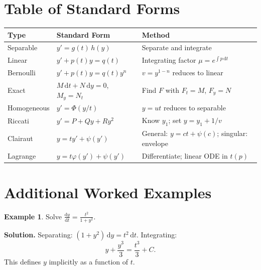 \documentclass[12pt,a4paper,openany]{book}
\theoremstyle{definition}
\newtheorem{example}[definition]{Example}
\theoremstyle{plain}
\theoremstyle{remark}
\newcommand{\dd}{\mathrm{d}}
\begin{document}
\section{Table of Standard Forms}
\label{sec:standard-forms-table}

\begin{center}
\renewcommand{\arraystretch}{1.6}
\begin{tabular}{@{}p{3cm}p{4.5cm}p{5.5cm}@{}}
\toprule
\textbf{Type} & \textbf{Standard Form} & \textbf{Method} \\
\midrule
Separable\index{separable equation} &
  $y' = g(t)\,h(y)$ &
  Separate and integrate \\
Linear\index{linear first-order ODE} &
  $y' + p(t)y = q(t)$ &
  Integrating factor $\mu = e^{\int p\,\dd t}$ \\
Bernoulli\index{Bernoulli equation} &
  $y' + p(t)y = q(t)y^n$ &
  $v = y^{1-n}$ reduces to linear \\
Exact\index{exact equation} &
  $M\,\dd t + N\,\dd y = 0$, $M_y = N_t$ &
  Find $F$ with $F_t=M$, $F_y=N$ \\
Homogeneous\index{homogeneous equation (first-order)} &
  $y' = \Phi(y/t)$ &
  $y = ut$ reduces to separable \\
Riccati\index{Riccati equation} &
  $y' = P + Qy + Ry^2$ &
  Know $y_1$; set $y = y_1+1/v$ \\
Clairaut\index{Clairaut equation} &
  $y = ty' + \psi(y')$ &
  General: $y=ct+\psi(c)$; singular: envelope \\
Lagrange\index{Lagrange equation} &
  $y = t\varphi(y')+\psi(y')$ &
  Differentiate; linear ODE in $t(p)$ \\
\bottomrule
\end{tabular}
\end{center}

\section{Additional Worked Examples}
\label{sec:additional-examples}

\begin{example}
\label{ex:extra-separable}
Solve $\displaystyle\frac{\dd y}{\dd t} = \frac{t^2}{1+y^2}$.

\textbf{Solution.} Separating: $(1+y^2)\,\dd y = t^2\,\dd t$. Integrating:
\[
  y + \frac{y^3}{3} = \frac{t^3}{3} + C.
\]
This defines $y$ implicitly as a function of $t$.
\end{example}
\end{document}
